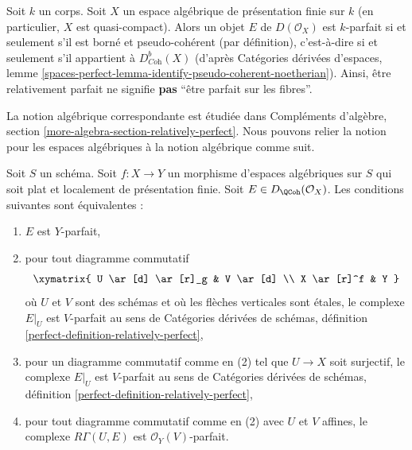 \begin{example}
\label{example-relatively-perfect-field}
Soit $k$ un corps. Soit $X$ un espace algébrique de présentation finie
sur $k$ (en particulier, $X$ est quasi-compact). Alors un objet $E$ de
$D(\mathcal{O}_X)$ est $k$-parfait si et seulement s'il est borné et
pseudo-cohérent (par définition), c'est-à-dire si et seulement s'il appartient à
$D^b_{\textit{Coh}}(X)$ (d'après
Catégories dérivées d'espaces, lemme
\ref{spaces-perfect-lemma-identify-pseudo-coherent-noetherian}).
Ainsi, être relativement parfait ne signifie {\bf pas} ``être parfait sur les fibres''.
\end{example}

\noindent
La notion algébrique correspondante est étudiée dans
Compléments d'algèbre, section \ref{more-algebra-section-relatively-perfect}.
Nous pouvons relier la notion pour les espaces algébriques à la
notion algébrique comme suit.

\begin{lemma}
\label{lemma-affine-locally-rel-perfect}
Soit $S$ un schéma. Soit $f : X \to Y$ un morphisme d'espaces algébriques
sur $S$ qui soit plat et localement de présentation finie.
Soit $E \in D_\QCoh(\mathcal{O}_X)$. Les conditions suivantes sont équivalentes :
\begin{enumerate}
\item $E$ est $Y$-parfait,
\item pour tout diagramme commutatif
$$
\xymatrix{
U \ar[d] \ar[r]_g & V \ar[d] \\
X \ar[r]^f & Y
}
$$
où $U$ et $V$ sont des schémas et où les flèches verticales sont \'etales, le complexe
$E|_U$ est $V$-parfait au sens de Catégories dérivées de schémas,
définition \ref{perfect-definition-relatively-perfect},
\item pour un diagramme commutatif comme en (2) tel que $U \to X$ soit
surjectif, le complexe $E|_U$ est $V$-parfait au sens de
Catégories dérivées de schémas,
définition \ref{perfect-definition-relatively-perfect},
\item pour tout diagramme commutatif comme en (2) avec $U$ et $V$
affines, le complexe $R\Gamma(U, E)$ est $\mathcal{O}_Y(V)$-parfait.
\end{enumerate}
\end{lemma}

